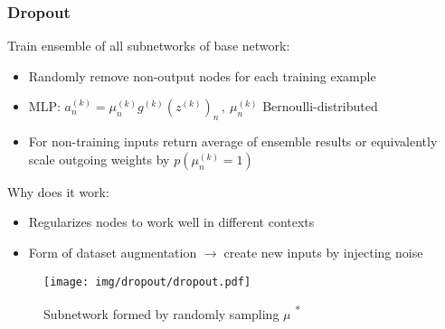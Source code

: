 \documentclass{beamer}
\newcommand{\arrow}{$\rightarrow\;$}
\renewcommand{\k}[2]{#1^{(#2)}}
\begin{document}
\begin{frame}
    \frametitle{Dropout}
    Train ensemble of all subnetworks of base network:
    \begin{itemize}
        \item Randomly remove non-output nodes for each training example
        \item MLP: $\k{a}{k}_n = \k{\mu}{k}_n \k{g}{k}(\k{z}{k})_n\,, \ \k{\mu}{k}_n$ Bernoulli-distributed
        \item For non-training inputs return average of ensemble results or
        equivalently scale outgoing weights by $p(\k{\mu}{k}_n = 1)$
    \end{itemize}
    \vspace{-0.5cm}
    \begin{minipage}{0.49\textwidth}
        \vspace{0.3cm}
        Why does it work:
        \begin{itemize}
            \item Regularizes nodes to work well in different contexts
            \item Form of dataset augmentation
            \arrow create new inputs by injecting noise
        \end{itemize}
    \end{minipage}
    \hspace{1em}
    \begin{minipage}{0.4\textwidth}
        \vspace{1cm}
        \begin{figure}
            \texttt{[image: img/dropout/dropout.pdf]}
            
            \caption{Subnetwork formed by randomly sampling $\mu$ \cite{dropout}\textsuperscript{*}}
        \end{figure}
    \end{minipage}
\end{frame}
\end{document}
